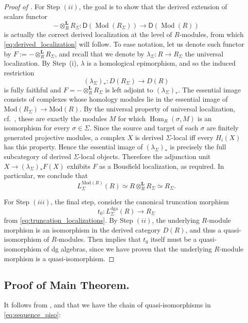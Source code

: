 \documentclass[11pt]{article}
\newcommand{\Mod}{\mathrm{Mod}}
\begin{document}
\begin{proof}[Proof of ]
For Step $(ii)$, the goal is to show that the derived extension of scalars functor
\[
-\otimes_R^{\mathbf L}R_\Sigma:
\mathsf D(\operatorname{Mod}(R_\Sigma))
\longrightarrow
\mathsf D(\operatorname{Mod}(R))
\]
is actually the correct derived localization at the level of $R$-modules, from which \eqref{eq:derived_localization} will follow. To ease notation, let us denote such functor by $F:=-\otimes_R^{\mathbf L}R_\Sigma$, and recall that we denote by $\lambda_\Sigma:R\to R_\Sigma$ the universal localization. By Step~(i), $\lambda$ is a homological epimorphism, and so the induced restriction
\[
 (\lambda_\Sigma)_*:D(R_\Sigma)\longrightarrow D(R)
\]
is fully faithful and $F=-\otimes_R^{\mathbf L}R_\Sigma$ is left adjoint to $(\lambda_\Sigma)_*$.  The essential image consists of complexes whose homology modules lie in the essential image of $\Mod(R_\Sigma)\to\Mod(R)$.  By the universal property of universal localization, cf.~\cite[Section 6]{KrauseStovicek}, these are exactly the modules $M$ for which $\operatorname{Hom}_R(\sigma,M)$ is an isomorphism for every $\sigma\in\Sigma$.  Since the source and target of each $\sigma$ are finitely generated projective modules, a complex $X$ is derived $\Sigma$-local iff every $H_i(X)$ has this property.  Hence the essential image of $(\lambda_\Sigma)_*$ is precisely the full subcategory of derived $\Sigma$-local objects.  Therefore the adjunction unit $X\to(\lambda_\Sigma)_*F(X)$ exhibits $F$ as a Bousfield localization, as required. In particular, we conclude that
\[
 L^{\Mod(R)}_\Sigma(R)\simeq R\otimes_R^{\mathbf L}R_\Sigma\simeq R_\Sigma.
\]

For Step $(iii)$, the final step, consider the canonical truncation morphism
$$t_0:L^{\mathrm{dga}}_\Sigma(R)\longrightarrow R_\Sigma$$
from \eqref{eq:truncation_localizations}. By Step $(ii)$, the underlying $R$-module morphism is an isomorphism in the derived category $D(R)$, and thus a quasi-isomorphism of $R$-modules. Then \cite[Theorem 4.38]{BCL} implies that $t_0$ itself must be a quasi-isomorphism of dg algebras, since we have proven that the underlying $R$-module morphism is a quasi-isomorphism.
\end{proof}
\color{black}

\subsection{ Proof of Main Theorem.}\label{ssec:proof_of_main_theorem} It follows from ,  and  that we have the chain of quasi-isomorphisms in \eqref{eq:sequence_qiso}:
\end{document}
